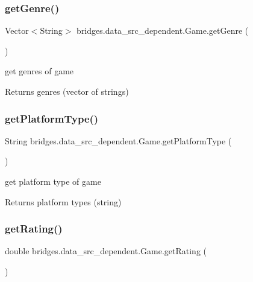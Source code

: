 \subsubsection{\texorpdfstring{get\+Genre()}{getGenre()}}
{\footnotesize\ttfamily Vector$<$String$>$ bridges.\+data\+\_\+src\+\_\+dependent.\+Game.\+get\+Genre (\begin{DoxyParamCaption}{ }\end{DoxyParamCaption})}

get genres of game \begin{DoxyReturn}{Returns}
genres (vector of strings) 
\end{DoxyReturn}
\mbox{\label{classbridges_1_1data__src__dependent_1_1_game_a1eef8e419c6302ba83ea595491412494}} 
\subsubsection{\texorpdfstring{get\+Platform\+Type()}{getPlatformType()}}
{\footnotesize\ttfamily String bridges.\+data\+\_\+src\+\_\+dependent.\+Game.\+get\+Platform\+Type (\begin{DoxyParamCaption}{ }\end{DoxyParamCaption})}

get platform type of game \begin{DoxyReturn}{Returns}
platform types (string) 
\end{DoxyReturn}
\mbox{\label{classbridges_1_1data__src__dependent_1_1_game_a83b444e2c487701b4e9789a6a35ae210}} 
\subsubsection{\texorpdfstring{get\+Rating()}{getRating()}}
{\footnotesize\ttfamily double bridges.\+data\+\_\+src\+\_\+dependent.\+Game.\+get\+Rating (\begin{DoxyParamCaption}{ }\end{DoxyParamCaption})}

